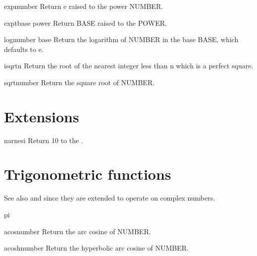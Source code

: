 \begin{function}{exp}{number}{}{}
  Return e raised to the power NUMBER.
\end{function}

\begin{function}{expt}{base power}{}{}
  Return BASE raised to the POWER.
\end{function}

\begin{function}{log}{number \op base}{}{}
  Return the logarithm of NUMBER in the base BASE, which defaults to e.
\end{function}

\begin{function}{isqrt}{n}{}{}
  Return the root of the nearest integer less than n which is a perfect
   square.
\end{function}

\begin{function}{sqrt}{number}{}{}
  Return the square root of NUMBER.
\end{function}

\section{Extensions}
\label{sec:exp-extensions}

\begin{function}{10}{n}{arnesi}{}
  Return 10 to the .
\end{function}

\section{Trigonometric functions}
\label{sec:trig-funct}

See also  and  since they are extended to operate
on complex numbers.

\begin{constant}{pi}{}{}{}
  
\end{constant}

\begin{function}{acos}{number}{}{}
  Return the arc cosine of NUMBER.
\end{function}

\begin{function}{acosh}{number}{}{}
  Return the hyperbolic arc cosine of NUMBER.
\end{function}

